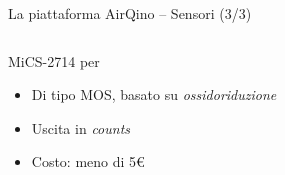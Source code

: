 \begin{frame}[t]{La piattaforma AirQino – Sensori (3/3)}
\begin{columns}

\begin{column}{0.5\textwidth}
\begin{center}

\begin{block}{MiCS-2714 per }
\begin{figure}[H]
    \centering
\end{figure}
\vspace{0.1cm}
\begin{itemize}
  \item Di tipo MOS, basato su \textit{ossidoriduzione}
  \item Uscita in \textit{counts}
  \item Costo: meno di 5€
\end{itemize}
\vspace{0.1cm}

\end{block}

\end{center}
\end{column}


\end{columns}
\end{frame}
